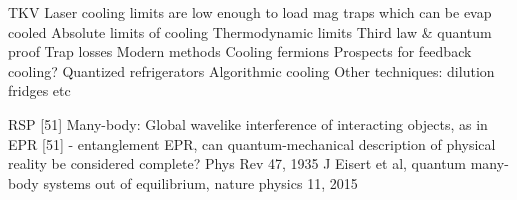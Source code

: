 	TKV Laser cooling limits are low enough to load mag traps which can be evap cooled
	Absolute limits of cooling Thermodynamic limits Third law \& quantum	proof Trap losses Modern methods Cooling fermions Prospects for feedback	cooling? Quantized refrigerators Algorithmic cooling Other techniques:	dilution fridges etc
		
	

	RSP [51] Many-body: Global wavelike interference of interacting objects, as in EPR [51] - entanglement 
		EPR, can quantum-mechanical description of physical reality be considered complete? Phys Rev 47, 1935
		J Eisert et al, quantum many-body systems out of equilibrium, nature physics 11, 2015